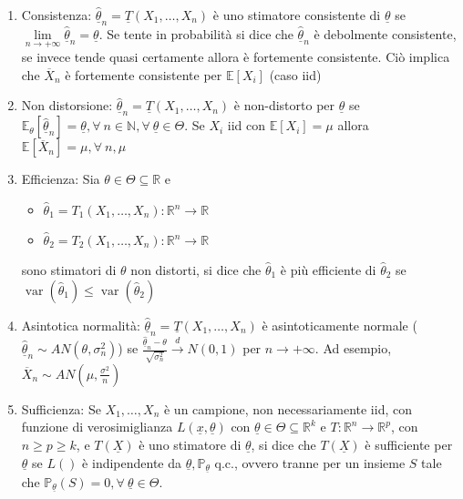 \documentclass[hidelinks, 10pt]{report}
\DeclareMathOperator{\var}{var}
\begin{document}
\begin{enumerate}
\item Consistenza: $ \underline{\hat{\theta}}_n = \underline{T} (X_1, \dotsc, X_n) $ \`e uno stimatore consistente di $ \underline{\theta} $ se $ \lim\limits_{n \to +\infty} \underline{\hat{\theta}}_n = \underline{\theta} $. Se tente in probabilit\`a si dice che $ \underline{\hat{\theta}}_n $ \`e debolmente consistente, se invece tende quasi certamente allora \`e fortemente consistente. Ci\`o implica che $ \overline{X}_n $ \`e fortemente consistente per $ \mathbb{E} [X_i] $ (caso iid)
\item Non distorsione: $ \underline{\hat{\theta}}_n = \underline{T} (X_1, \dotsc, X_n) $ \`e non-distorto per $ \underline{\theta} $ se $ \mathbb{E}_\theta [ \underline{\hat{\theta}}_n ] = \underline{\theta}, \forall\ n \in \mathbb{N}, \forall\ \underline{\theta} \in \Theta $. Se $ X_i $ iid con $ \mathbb{E} [X_i] = \mu $ allora $ \mathbb{E} [\overline{X}_n] = \mu, \forall\ n, \mu $
\item Efficienza: Sia $ \theta \in \Theta \subseteq \mathbb{R} $ e 
\begin{itemize}
\item $ \hat{\theta}_1 = T_1 (X_1, \dotsc, X_n) : \mathbb{R}^n \to \mathbb{R} $
\item $ \hat{\theta}_2 = T_2 (X_1, \dotsc, X_n) : \mathbb{R}^n \to \mathbb{R} $
\end{itemize}
sono stimatori di $ \theta $ non distorti, si dice che $ \hat{\theta}_1 $ \`e pi\`u efficiente di $ \hat{\theta}_2 $ se $ \var(\hat{\theta}_1) \le \var(\hat{\theta}_2) $
\item Asintotica normalit\`a: $ \underline{\hat{\theta}}_n = \underline{T} (X_1, \dotsc, X_n) $ \`e asintoticamente normale ($ \underline{\hat{\theta}}_n \sim AN(\theta, \sigma_n^2) $) se $ \frac{\underline{\hat{\theta}}_n - \theta}{\sqrt{\sigma^2_n}} \stackrel{d}{\to} N(0, 1) $ per $ n \to +\infty $. Ad esempio, $ \overline{X}_n \sim AN \left( \mu, \frac{\sigma^2}{n} \right) $
\item Sufficienza: Se $ X_1, \dotsc, X_n $ \`e un campione, non necessariamente iid, con funzione di verosimiglianza $ L(\underline{x}, \underline{\theta}) $ con $ \underline{\theta} \in \Theta \subseteq \mathbb{R}^k $ e $ T : \mathbb{R}^n \to \mathbb{R}^p $, con $ n \ge p \ge k $, e $ T(\underline{X}) $ \`e uno stimatore di $ \underline{\theta} $, si dice che $ T(\underline{X}) $ \`e sufficiente per $ \underline{\theta} $ se $ L() $ \`e indipendente da $ \underline{\theta}, \mathbb{P}_{\underline{\theta}} $ q.c., ovvero tranne per un insieme $ S $ tale che $ \mathbb{P}_{\underline{\theta}} (S) = 0, \forall\ \underline{\theta} \in \Theta $. 
\end{enumerate}
\end{document}
